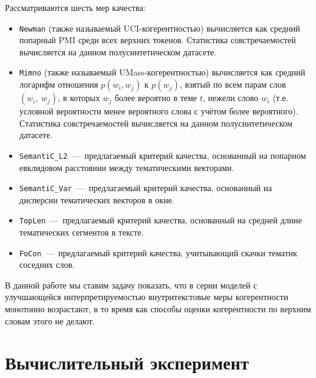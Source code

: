 Рассматриваются шесть мер качества: 
\begin{itemize}
    \item \texttt{Newman} (также называемый UCI-когерентностью) вычисляется как средний попарный PMI среди всех верхних токенов. Статистика совстречаемостей вычисляется на данном полусинтетическом датасете.
    \item \texttt{Mimno} (также называемый UMass-когерентностью) вычисляется как средний логарифм отношения $p(w_i, w_j)$ к $p(w_j)$, взятый по всем парам слов $(w_i,~w_j)$, в которых $w_j$ более вероятно в теме $t$, нежели слово $w_i$ (т.е. условной вероятности менее вероятного слова с учётом более вероятного). Статистика совстречаемостей вычисляется на данном полусинтетическом датасете. 
    \item  \texttt{SemantiC\_L2}~---~предлагаемый критерий качества, основанный на попарном евклидовом расстоянии между тематическими векторами.
    \item  \texttt{SemantiC\_Var}~---~предлагаемый критерий качества, основанный на дисперсии тематических векторов в окне.
    \item  \texttt{TopLen}~---~предлагаемый критерий качества, основанный на средней длине тематических сегментов в тексте.
    \item  \texttt{FoCon}~---~предлагаемый критерий качества, учитывающий скачки тематик соседних слов.
\end{itemize}

В данной работе мы ставим задачу показать, что в серии моделей с улучшающейся интерпретируемостью внутритекстовые меры когерентности монотонно возрастают, в то время как способы оценки когерентности по верхним словам этого не делают.

\section{Вычислительный эксперимент}

